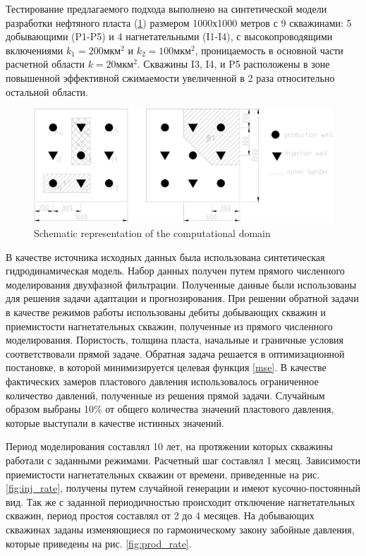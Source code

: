 \documentclass{article}
\begin{document}
Тестирование предлагаемого подхода выполнено на синтетической модели разработки нефтяного пласта (\ref{fig:schime}) размером 1000х1000 метров с 9 скважинами: 5 добывающими (P1-P5) и 4 нагнетательными (I1-I4), с высокопроводящими включениями $k_1 = 200 мкм^2$ и $k_2 = 100 мкм^2$, проницаемость в основной части расчетной области $k = 20 мкм^2$. Скважины I3, I4, и P5 расположены в зоне повышенной эффективной сжимаемости увеличенной в 2 раза относительно остальной области. 

\begin{figure}
	\centering
	\includegraphics[width=0.7\linewidth]{images/fig2.eps}
	\caption{Schematic representation of the computational domain}
	\label{fig:schime}
\end{figure}

В качестве источника исходных данных была использована синтетическая гидродинамическая модель. Набор данных получен путем прямого численного моделирования двухфазной фильтрации. Полученные данные были использованы для решения задачи адаптации и прогнозирования.
При решении обратной задачи в качестве режимов работы использованы дебиты добывающих скважин и приемистости нагнетательных скважин, полученные из прямого численного моделирования. Пористость, толщина пласта, начальные и граничные условия соответствовали прямой задаче. Обратная задача решается в оптимизационной постановке, в которой минимизируется целевая функция {\ref{mse}}. В качестве фактических замеров пластового давления использовалось ограниченное количество давлений, полученные из решения прямой задачи. Случайным образом выбраны 10\% от общего количества значений пластового давления, которые выступали в качестве истинных значений.

Период моделирования составлял 10 лет, на протяжении которых скважины работали с заданными режимами. Расчетный шаг составлял 1 месяц. Зависимости приемистости нагнетательных скважин от времени, приведенные на рис. \ref{fig:inj_rate}, получены путем случайной генерации и имеют кусочно-постоянный вид. Так же с заданной периодичностью происходит отключение нагнетательных скважин, период простоя составлял от 2 до 4 месяцев. На добывающих скважинах заданы изменяющиеся по гармоническому закону забойные давления, которые приведены на рис. \ref{fig:prod_rate}.
\end{document}
